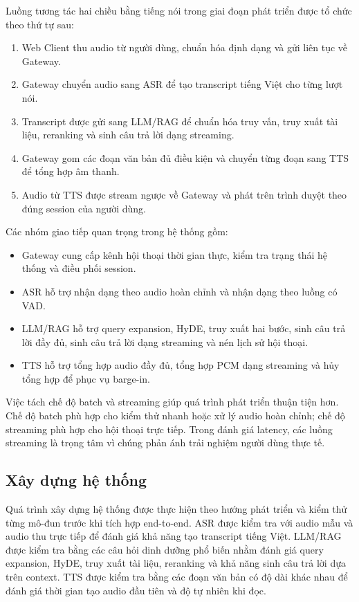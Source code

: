 \documentclass[a4paper,13pt,oneside]{report}
\begin{document}
Luồng tương tác hai chiều bằng tiếng nói trong giai đoạn phát triển được tổ chức theo thứ tự sau:

\begin{enumerate}[label=\arabic*)]
    \item Web Client thu audio từ người dùng, chuẩn hóa định dạng và gửi liên tục về Gateway.
    \item Gateway chuyển audio sang ASR để tạo transcript tiếng Việt cho từng lượt nói.
    \item Transcript được gửi sang LLM/RAG để chuẩn hóa truy vấn, truy xuất tài liệu, reranking và sinh câu trả lời dạng streaming.
    \item Gateway gom các đoạn văn bản đủ điều kiện và chuyển từng đoạn sang TTS để tổng hợp âm thanh.
    \item Audio từ TTS được stream ngược về Gateway và phát trên trình duyệt theo đúng session của người dùng.
\end{enumerate}

Các nhóm giao tiếp quan trọng trong hệ thống gồm:

\begin{itemize}
    \item Gateway cung cấp kênh hội thoại thời gian thực, kiểm tra trạng thái hệ thống và điều phối session.
    \item ASR hỗ trợ nhận dạng theo audio hoàn chỉnh và nhận dạng theo luồng có VAD.
    \item LLM/RAG hỗ trợ query expansion, HyDE, truy xuất hai bước, sinh câu trả lời đầy đủ, sinh câu trả lời dạng streaming và nén lịch sử hội thoại.
    \item TTS hỗ trợ tổng hợp audio đầy đủ, tổng hợp PCM dạng streaming và hủy tổng hợp để phục vụ barge-in.
\end{itemize}

Việc tách chế độ batch và streaming giúp quá trình phát triển thuận tiện hơn. Chế độ batch phù hợp cho kiểm thử nhanh hoặc xử lý audio hoàn chỉnh; chế độ streaming phù hợp cho hội thoại trực tiếp. Trong đánh giá latency, các luồng streaming là trọng tâm vì chúng phản ánh trải nghiệm người dùng thực tế.

\subsection{Xây dựng hệ thống}

Quá trình xây dựng hệ thống được thực hiện theo hướng phát triển và kiểm thử từng mô-đun trước khi tích hợp end-to-end. ASR được kiểm tra với audio mẫu và audio thu trực tiếp để đánh giá khả năng tạo transcript tiếng Việt. LLM/RAG được kiểm tra bằng các câu hỏi dinh dưỡng phổ biến nhằm đánh giá query expansion, HyDE, truy xuất tài liệu, reranking và khả năng sinh câu trả lời dựa trên context. TTS được kiểm tra bằng các đoạn văn bản có độ dài khác nhau để đánh giá thời gian tạo audio đầu tiên và độ tự nhiên khi đọc.
\end{document}
